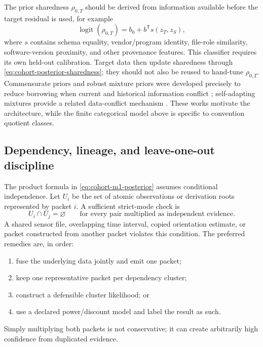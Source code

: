 \documentclass[11pt]{article}
\begin{document}
    The prior sharedness $\rho_{0,T}$ should be derived from information available before the
    target residual is used, for example
    \begin{equation}
        \operatorname{logit}(\rho_{0,T})
        =b_0+b^{\mathsf T}s(z_T,z_S),
        \label{eq:cohort-sharedness-regression}
    \end{equation}
    where $s$ contains schema equality, vendor/program identity, file-role similarity,
    software-version proximity, and other provenance features. This classifier requires its
    own held-out calibration. Target data then update sharedness through
    \eqref{eq:cohort-posterior-sharedness}; they should not also be reused to hand-tune
    $\rho_{0,T}$. Commensurate priors and robust mixture priors were developed precisely to
    reduce borrowing when current and historical information conflict
    \cite{hobbs2011,schmidli2014}; self-adapting mixtures provide a related data-conflict
    mechanism \cite{yang2023}. These works motivate the architecture, while the finite
    categorical model above is specific to convention quotient classes.

    \subsection{Dependency, lineage, and leave-one-out discipline}

    The product formula in \eqref{eq:cohort-m1-posterior} assumes conditional independence.
    Let $U_i$ be the set of atomic observations or derivation roots represented by packet $i$.
    A sufficient strict-mode check is
    \begin{equation}
        U_i\cap U_j=\varnothing
        \qquad\text{for every pair multiplied as independent evidence.}
        \label{eq:cohort-lineage-disjoint}
    \end{equation}
    A shared sensor file, overlapping time interval, copied orientation estimate, or packet
    constructed from another packet violates this condition. The preferred remedies are,
    in order:
    \begin{enumerate}[nosep]
    \item fuse the underlying data jointly and emit one packet;
    \item keep one representative packet per dependency cluster;
    \item construct a defensible cluster likelihood; or
    \item use a declared power/discount model and label the result as such.
    \end{enumerate}
    Simply multiplying both packets is not conservative; it can create arbitrarily high
    confidence from duplicated evidence.
\end{document}
